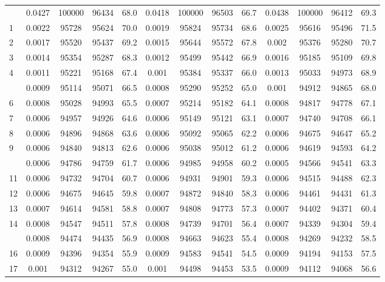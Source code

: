 \documentclass[
  14pt,
]{article}
\begin{document}
\begin{longtable}[t]{lcccccccccccc}
\endfoot
\bottomrule
\endlastfoot
0 & 0.0427 & 100000 & 96434 & 68.0 & 0.0418 & 100000 & 96503 & 66.7 & 0.0438 & 100000 & 96412 & 69.3\\
1 & 0.0022 & 95728 & 95624 & 70.0 & 0.0019 & 95824 & 95734 & 68.6 & 0.0025 & 95616 & 95496 & 71.5\\
2 & 0.0017 & 95520 & 95437 & 69.2 & 0.0015 & 95644 & 95572 & 67.8 & 0.002 & 95376 & 95280 & 70.7\\
3 & 0.0014 & 95354 & 95287 & 68.3 & 0.0012 & 95499 & 95442 & 66.9 & 0.0016 & 95185 & 95109 & 69.8\\
4 & 0.0011 & 95221 & 95168 & 67.4 & 0.001 & 95384 & 95337 & 66.0 & 0.0013 & 95033 & 94973 & 68.9\\
\addlinespace
5 & 0.0009 & 95114 & 95071 & 66.5 & 0.0008 & 95290 & 95252 & 65.0 & 0.001 & 94912 & 94865 & 68.0\\
6 & 0.0008 & 95028 & 94993 & 65.5 & 0.0007 & 95214 & 95182 & 64.1 & 0.0008 & 94817 & 94778 & 67.1\\
7 & 0.0006 & 94957 & 94926 & 64.6 & 0.0006 & 95149 & 95121 & 63.1 & 0.0007 & 94740 & 94708 & 66.1\\
8 & 0.0006 & 94896 & 94868 & 63.6 & 0.0006 & 95092 & 95065 & 62.2 & 0.0006 & 94675 & 94647 & 65.2\\
9 & 0.0006 & 94840 & 94813 & 62.6 & 0.0006 & 95038 & 95012 & 61.2 & 0.0006 & 94619 & 94593 & 64.2\\
\addlinespace
10 & 0.0006 & 94786 & 94759 & 61.7 & 0.0006 & 94985 & 94958 & 60.2 & 0.0005 & 94566 & 94541 & 63.3\\
11 & 0.0006 & 94732 & 94704 & 60.7 & 0.0006 & 94931 & 94901 & 59.3 & 0.0006 & 94515 & 94488 & 62.3\\
12 & 0.0006 & 94675 & 94645 & 59.8 & 0.0007 & 94872 & 94840 & 58.3 & 0.0006 & 94461 & 94431 & 61.3\\
13 & 0.0007 & 94614 & 94581 & 58.8 & 0.0007 & 94808 & 94773 & 57.3 & 0.0007 & 94402 & 94371 & 60.4\\
14 & 0.0008 & 94547 & 94511 & 57.8 & 0.0008 & 94739 & 94701 & 56.4 & 0.0007 & 94339 & 94304 & 59.4\\
\addlinespace
15 & 0.0008 & 94474 & 94435 & 56.9 & 0.0008 & 94663 & 94623 & 55.4 & 0.0008 & 94269 & 94232 & 58.5\\
16 & 0.0009 & 94396 & 94354 & 55.9 & 0.0009 & 94583 & 94541 & 54.5 & 0.0009 & 94194 & 94153 & 57.5\\
17 & 0.001 & 94312 & 94267 & 55.0 & 0.001 & 94498 & 94453 & 53.5 & 0.0009 & 94112 & 94068 & 56.6\\

\end{longtable}
\end{document}
